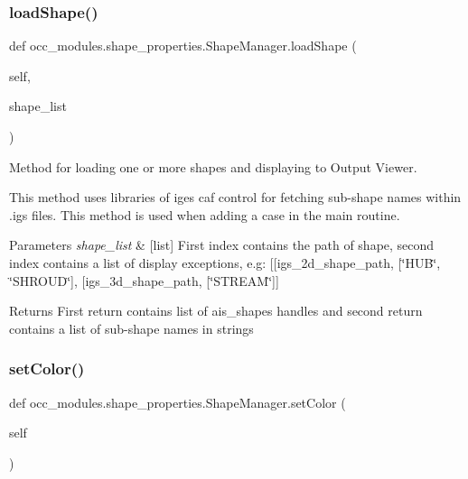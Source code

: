 \subsubsection{\texorpdfstring{load\+Shape()}{loadShape()}}
{\footnotesize\ttfamily def occ\+\_\+modules.\+shape\+\_\+properties.\+Shape\+Manager.\+load\+Shape (\begin{DoxyParamCaption}\item[{}]{self,  }\item[{}]{shape\+\_\+list }\end{DoxyParamCaption})}



Method for loading one or more shapes and displaying to Output Viewer. 

This method uses libraries of iges caf control for fetching sub-\/shape names within .igs files. This method is used when adding a case in the main routine.


\begin{DoxyParams}{Parameters}
{\em shape\+\_\+list} & \mbox{[}list\mbox{]} First index contains the path of shape, second index contains a list of display exceptions, e.\+g\+: \mbox{[}\mbox{[}igs\+\_\+2d\+\_\+shape\+\_\+path, \mbox{[}\char`\"{}\+H\+U\+B\char`\"{}, \char`\"{}\+S\+H\+R\+O\+U\+D\char`\"{}\mbox{]}, \mbox{[}igs\+\_\+3d\+\_\+shape\+\_\+path, \mbox{[}\char`\"{}\+S\+T\+R\+E\+A\+M\char`\"{}\mbox{]}\mbox{]} \\
\hline
\end{DoxyParams}
\begin{DoxyReturn}{Returns}
First return contains list of ais\+\_\+shapes handles and second return contains a list of sub-\/shape names in strings 
\end{DoxyReturn}
\hypertarget{a00094_ac659823f3085963daf751a6a94b366a7}{}\label{a00094_ac659823f3085963daf751a6a94b366a7} 
\subsubsection{\texorpdfstring{set\+Color()}{setColor()}}
{\footnotesize\ttfamily def occ\+\_\+modules.\+shape\+\_\+properties.\+Shape\+Manager.\+set\+Color (\begin{DoxyParamCaption}\item[{}]{self }\end{DoxyParamCaption})}



